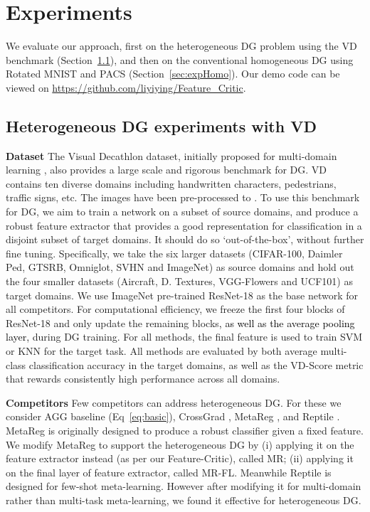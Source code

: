 \documentclass{article}
\newcommand{\modelname}{Feature-Critic}
\newcommand{\keypoint}[1]{\vspace{0.0cm}\noindent\textbf{#1}\quad}
\newcommand{\nice}[1]{\textcolor{black}{#1}}
\begin{document}
\section{Experiments}
We evaluate our approach, first on the heterogeneous DG problem using the VD benchmark (Section~\ref{sec:expHetero}), and then on the conventional homogeneous DG using Rotated MNIST and PACS (Section~\ref{sec:expHomo}). Our demo code can be viewed on \url{https://github.com/liyiying/Feature\_Critic}.

\subsection{Heterogeneous DG experiments with VD}\label{sec:expHetero}
\keypoint{Dataset} The Visual Decathlon dataset, initially proposed for multi-domain learning \cite{Rebuffi17}, also provides a large scale and rigorous benchmark for DG. VD contains ten diverse domains including handwritten characters, pedestrians, traffic signs, etc. The images have been pre-processed to . To use this benchmark for DG, we aim to train a network on a subset of source domains, and produce a robust feature extractor that provides a good representation for classification in a disjoint subset of target domains. It should do so `out-of-the-box', without further fine tuning. Specifically, we take the six larger datasets (CIFAR-100, Daimler Ped, GTSRB, Omniglot, SVHN and ImageNet) as source domains and hold out the four smaller datasets (Aircraft, D. Textures, VGG-Flowers and UCF101) as target domains. We use ImageNet pre-trained ResNet-18 \cite{He16} as the base network for all competitors. For computational efficiency, we freeze the first four blocks of ResNet-18 and only update the remaining blocks\nice{, as well as the average pooling layer,} during DG training. For all methods, the final feature is used to train SVM or KNN for the target task. All methods are evaluated by both average multi-class classification accuracy in the target domains, as well as the VD-Score metric \cite{Rebuffi17} that rewards consistently high performance across all domains.

\keypoint{Competitors} Few competitors can address heterogeneous DG. For these we consider AGG baseline (Eq~\ref{eq:basic}), CrossGrad \cite{Shankar18}, MetaReg \cite{Balaji18}, and Reptile \cite{nichol2018reptileFOML}. MetaReg is originally designed to produce a robust classifier given a fixed feature. We modify MetaReg to support the heterogeneous DG by (i) applying it on the feature extractor instead (as per our \modelname), called MR; (ii) applying it on the final layer of feature extractor, called MR-FL. Meanwhile Reptile is designed for few-shot meta-learning. However after modifying it for multi-domain rather than multi-task meta-learning, we found it effective for heterogeneous DG.
\end{document}
